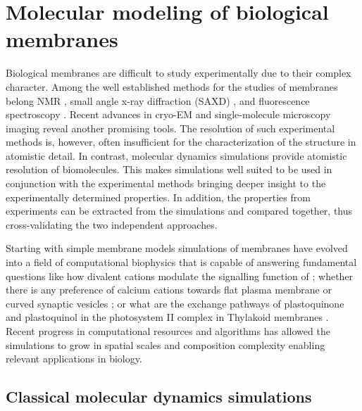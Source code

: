 \chapter{Molecular modeling of biological membranes}
\label{chap:methods}

Biological membranes are difficult to study experimentally due to their complex character. 
Among the well established methods for the studies of membranes belong
 NMR                                 \citep{catte16, botan15, seelig80, seelig90, seelig87}, 
small angle x-ray diffraction (SAXD) \citep{ollila16, pabst07}, 
and fluorescence spectroscopy        \citep{javanainen17, melcrova16, vacha09a}. 
Recent advances in cryo-EM             \citep{chiu2017editorial, nogales2015development}
and single-molecule microscopy imaging \citep{ritchie2013single}
reveal another promising tools. 
The resolution of such experimental methods is, however, often insufficient 
for the characterization of the structure in atomistic detail. 
In contrast, molecular dynamics simulations provide atomistic resolution of biomolecules.
This makes simulations well suited to be used in conjunction with the experimental methods
bringing deeper insight to the experimentally determined properties. 
In addition, the properties from experiments can be extracted from the simulations 
and compared together, thus cross-validating the two independent approaches. 

Starting with simple membrane models \citep{Berger97, bockmann04, bockmann03, sachs04, sachs04_potential} 
simulations of membranes have evolved into a field of computational biophysics
that is capable of answering fundamental questions like
how divalent cations modulate the signalling function of  \citep{Bilkova2017Calcium}; 
whether there is any preference of calcium cations towards flat plasma membrane or curved synaptic vesicles \citep{magarkar2017};
or what are the exchange pathways of plastoquinone and plastoquinol in the photosystem II complex in Thylakoid membranes \citep{eerden17}. 
Recent progress in computational resources and algorithms
has allowed the simulations to grow in spatial scales and composition complexity 
enabling relevant applications in biology. \citep{perspective_cecam_lugano_2018} 


\section{Classical molecular dynamics simulations}
\label{section:md}

